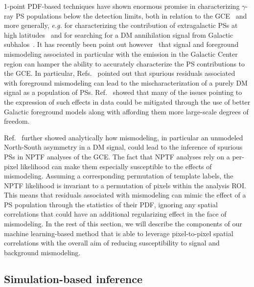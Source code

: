 \documentclass[prd,aps,10pt,nofootinbib,twocolumn,superscriptaddress,preprintnumbers,balancelastpage,longbibliography]{revtex4-1}
\begin{document}
1-point PDF-based techniques have shown enormous promise in characterizing $\gamma$-ray PS populations below the \Fermi detection limits, both in relation to the GCE~\cite{Lee:2015fea,Leane:2020pfc,Leane:2020nmi,Buschmann:2020adf} and more generally, \emph{e.g.} for characterizing the contribution of extragalactic PSs at high latitudes~\cite{Lisanti:2016jub} and for searching for a DM annihilation signal from Galactic subhalos~\cite{Somalwar:2020awt}. It has recently been point out however~\cite{Leane:2019xiy,Leane:2020pfc} that signal and foreground mismodeling associated in particular with the emission in the Galactic Center region can hamper the ability to accurately characterize the PS contributions to the GCE. In particular, Refs.~\cite{Lee:2015fea,Leane:2019xiy,Chang:2019ars} pointed out that spurious residuals associated with foreground mismodeling can lead to the mischaracterization of a purely DM signal as a population of PSs. Ref.~\cite{Buschmann:2020adf} showed that many of the issues pointing to the expression of such effects in \Fermi data could be mitigated through the use of better Galactic foreground models along with affording them more large-scale degrees of freedom.

Ref.~\cite{Leane:2020nmi} further showed analytically how mismodeling, in particular an unmodeled North-South asymmetry in a DM signal, could lead to the inference of spurious PSs in NPTF analyses of the GCE.
The fact that NPTF analyses rely on a per-pixel likelihood can make them especially susceptible to the effects of mismodeling. Assuming a corresponding permutation of template labels, the NPTF likelihood is invariant to a permutation of pixels within the analysis ROI. This means that residuals associated with mismodeling can mimic the effect of a PS population through the statistics of their PDF, ignoring any spatial correlations that could have an additional regularizing effect in the face of mismodeling. In the rest of this section, we will describe the components of our machine learning-based method that is able to leverage pixel-to-pixel spatial correlations with the overall aim of reducing susceptibility to signal and background mismodeling.

\subsection{Simulation-based inference}

\end{document}
